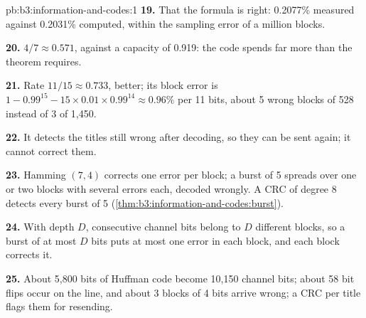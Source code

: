 \begin{solution}{pb:b3:information-and-codes:1}
\textbf{19.} That the formula is right: 0.2077\% measured against 0.2031\% computed, within the sampling error of a million blocks.

\textbf{20.} $4/7 \approx 0.571$, against a capacity of 0.919: the code spends far more than the theorem requires.

\textbf{21.} Rate $11/15 \approx 0.733$, better; its block error is $1 - 0.99^{15} - 15 \times 0.01 \times 0.99^{14} \approx 0.96\%$ per 11 bits, about 5 wrong blocks of 528 instead of 3 of 1,450.

\textbf{22.} It detects the titles still wrong after decoding, so they can be sent again; it cannot correct them.

\textbf{23.} Hamming $(7, 4)$ corrects one error per block; a burst of 5 spreads over one or two blocks with several errors each, decoded wrongly. A CRC of degree 8 detects every burst of 5 (\cref{thm:b3:information-and-codes:burst}).

\textbf{24.} With depth $D$, consecutive channel bits belong to $D$ different blocks, so a burst of at most $D$ bits puts at most one error in each block, and each block corrects it.

\textbf{25.} About 5,800 bits of Huffman code become 10,150 channel bits; about 58 bit flips occur on the line, and about 3 blocks of 4 bits arrive wrong; a CRC per title flags them for resending.
\end{solution}
